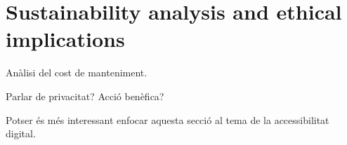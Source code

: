 \section{Sustainability analysis and ethical implications}

Anàlisi del cost de manteniment.

Parlar de privacitat? Acció benèfica?

Potser és més interessant enfocar aquesta secció al tema de la accessibilitat digital.